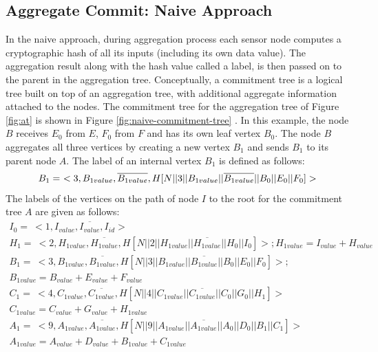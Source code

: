 	\subsection{Aggregate Commit: Naive Approach}
		\label{sub:aggregate_commit_naive_approach}
		In the naive approach, during aggregation process each sensor node computes a cryptographic hash of all its inputs (including its own data value).
		The aggregation result along with the hash value called a label, is then passed on to the parent in the aggregation tree.
		Conceptually, a commitment tree is a logical tree built on top of an aggregation tree, with additional aggregate information attached to the nodes. 
		The commitment tree for the aggregation tree of Figure \ref{fig:at} is  shown in Figure \ref{fig:naive-commitment-tree} .
		In this example, the node $B$ receives $E_{0}$ from $E$, $F_{0}$ from $F$ and has its own leaf vertex $B_{0}$.
		The node $B$ aggregates all three vertices by creating a new vertex $B_{1}$ and sends $B_{1}$ to its parent node $A$.
		The label of an internal vertex $B_{1}$ is defined as follows:
		\begin{equation}
			B_{1} =\ <3, B_{1value}, \overline{B_{1value}}, H[N || 3 || B_{1value} || \overline{B_{1value}} ||B_{0}||E_{0}||F_{0}]>\\
		\end{equation}
		The labels of the vertices on the path of node $I$ to the root for the commitment tree $A$ are given as follows:
		\begin{equation}
			\begin{array}{l}
				I_{0} =\ <1, I_{value}, \overline{I_{value}}, I_{id}>\\
				H_{1} =\ <2, H_{1value}, \overline{H_{1value}}, H [ N || 2 || H_{1value} || \overline{H_{1value}} || H_{0} || I_{0} ] > ; H_{1value} = I_{value} + H_{value}\\
				B_{1} =\ <3, B_{1value}, \overline{B_{1value}}, H [ N || 3 || B_{1value} || \overline{B_{1value}} || B_{0} || E_{0} || F_{0} ] > ; \\ 
				B_{1value} = B_{value} + E_{value} + F_{value} \\
				C_{1} =\ <4, C_{1value}, \overline{C_{1value}}, H [ N || 4 || C_{1value} || \overline{C_{1value}} || C_{0} || G_{0} || H_{1} ] > \\
				C_{1value} = C_{value} + G_{value} + H_{1value} \\
				A_{1} =\ <9, A_{1value}, \overline{A_{1value}}, H [ N || 9 || A_{1value} || \overline{A_{1value}} || A_{0} || D_{0} || B_{1} || C_{1} ] >\\
				A_{1value} = A_{value} + D_{value} + B_{1value} + C_{1value} \\
			\end{array}
		\end{equation}

